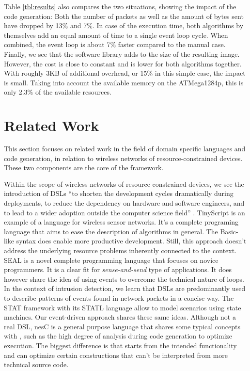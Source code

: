 \documentclass[3p,times,procedia]{elsarticle}
\begin{document}
Table \ref{tbl:results} also compares the two situations, showing the impact of
the code generation: Both the number of packets as well as the amount of bytes
sent have dropped by 13\% and 7\%. In case of the execution time, both
algorithms by themselves add an equal amount of time to a single event loop
cycle. When combined, the event loop is about 7\% faster compared to the manual
case. Finally, we see that the software library adds to the size of the
resulting image. However, the cost is close to constant and is lower for both
algorithms together. With roughly 3KB of additional overhead, or 15\% in this
simple case, the impact is small. Taking into account the available memory on
the ATMega1284p, this is only 2.3\% of the available resources.

\section{Related Work}
\label{related}

This section focuses on related work in the field of domain specific languages
and code generation, in relation to wireless networks of resource-constrained
devices. These two components are the core of the \FOO framework.

Within the scope of wireless networks of resource-constrained devices, we see
the introduction of DSLs \enquote{to shorten the development cycles
dramatically during deployments, to reduce the dependency on hardware and
software engineers, and to lead to a wider adoption outside the computer
science field} \cite{sadilek2008domain}. TinyScript \cite{levis2004tinyscript}
is an example of a language for wireless sensor networks. It's a complete
programing language that aims to ease the description of algorithms in general.
The Basic-like syntax does enable more productive development. Still, this
approach doesn't address the underlying resource problems inherently connected
to the context. SEAL \cite{elsts2013seal} is a novel complete programming
language that focuses on novice programmers. It is a clear fit for
\emph{sense-and-send} type of applications. It does however share the idea of
using events to overcome the technical nature of loops. In the context of
intrusion detection, we learn that DSLs are predominantly used to describe
patterns of events found in network packets
\cite{sekar1999high,roesch1999snort} in a concise way. The STAT framework with
its STATL language \cite{eckmann2002statl,vigna2003designing} allow to model
scenarios using state machines. Our event-driven approach shares these same
ideas. Although not a real DSL, nesC \cite{gay2003nesc} is a general purpose
language that shares some typical concepts with \FOO, such as the high degree
of analysis during code generation to optimize execution. The biggest
difference is that \FOO starts from the intended functionality and can optimize
certain constructions that can't be interpreted from more technical source code.
\end{document}
